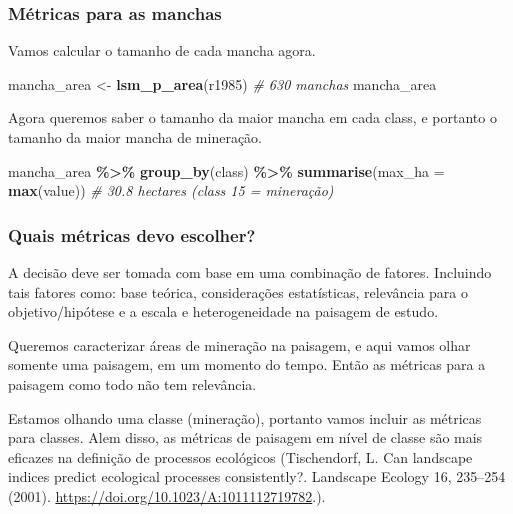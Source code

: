 \documentclass[
]{article}
\newenvironment{Shaded}{\begin{snugshade}}{\end{snugshade}}
\newcommand{\AttributeTok}[1]{\textcolor[rgb]{0.13,0.29,0.53}{#1}}
\newcommand{\CommentTok}[1]{\textcolor[rgb]{0.56,0.35,0.01}{\textit{#1}}}
\newcommand{\FunctionTok}[1]{\textcolor[rgb]{0.13,0.29,0.53}{\textbf{#1}}}
\newcommand{\NormalTok}[1]{#1}
\newcommand{\OtherTok}[1]{\textcolor[rgb]{0.56,0.35,0.01}{#1}}
\newcommand{\SpecialCharTok}[1]{\textcolor[rgb]{0.81,0.36,0.00}{\textbf{#1}}}
\begin{document}
\hypertarget{muxe9tricas-para-as-manchas}{%
\subsubsection{Métricas para as manchas}\label{muxe9tricas-para-as-manchas}}

Vamos calcular o tamanho de cada mancha agora.

\begin{Shaded}
\begin{Highlighting}[]
\NormalTok{mancha\_area }\OtherTok{\textless{}{-}} \FunctionTok{lsm\_p\_area}\NormalTok{(r1985) }\CommentTok{\# 630 manchas}
\NormalTok{mancha\_area}
\end{Highlighting}
\end{Shaded}

Agora queremos saber o tamanho da maior mancha em cada class, e
portanto o tamanho da maior mancha de mineração.

\begin{Shaded}
\begin{Highlighting}[]
\NormalTok{mancha\_area }\SpecialCharTok{\%\textgreater{}\%} 
\FunctionTok{group\_by}\NormalTok{(class) }\SpecialCharTok{\%\textgreater{}\%} 
\FunctionTok{summarise}\NormalTok{(}\AttributeTok{max\_ha =} \FunctionTok{max}\NormalTok{(value))}
\CommentTok{\# 30.8 hectares (class 15 = mineração)}
\end{Highlighting}
\end{Shaded}

\hypertarget{quais-muxe9tricas-devo-escolher}{%
\subsubsection{Quais métricas devo escolher?}\label{quais-muxe9tricas-devo-escolher}}

A decisão deve ser tomada com base em uma combinação de fatores.
Incluindo tais fatores como: base teórica, considerações estatísticas,
relevância para o objetivo/hipótese e a escala e heterogeneidade
na paisagem de estudo.

Queremos caracterizar áreas de mineração na paisagem, e aqui vamos
olhar somente uma paisagem, em um momento do tempo. Então as métricas
para a paisagem como todo não tem relevância.

Estamos olhando uma classe (mineração), portanto vamos incluir as
métricas para classes. Alem disso, as métricas de paisagem em nível de
classe são mais eficazes na definição de processos ecológicos
(Tischendorf, L. Can landscape indices predict ecological processes
consistently?. Landscape Ecology 16, 235--254 (2001).
\url{https://doi.org/10.1023/A:1011112719782}.).
\end{document}
